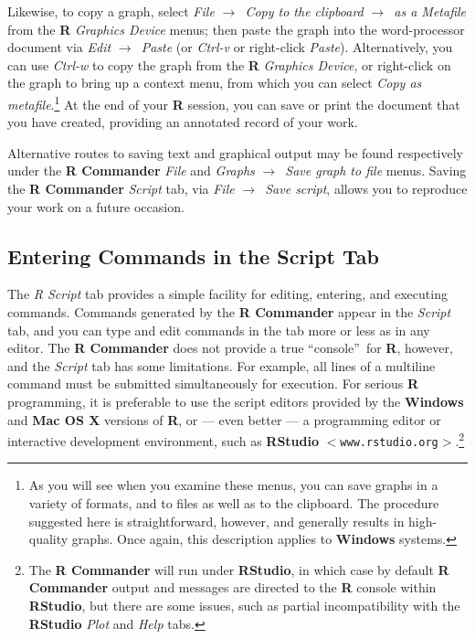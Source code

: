 \documentclass{article}%
\begin{document}
Likewise, to copy a graph, select \emph{File }$\longrightarrow$\emph{\ Copy to
the clipboard }$\longrightarrow$\emph{\ as a Metafile} from the \textbf{R}
\emph{Graphics Device} menus; then paste the graph into the word-processor
document via \emph{Edit }$\longrightarrow$\emph{\ Paste} (or \emph{Ctrl-v} or
right-click \emph{Paste}). Alternatively, you can use \emph{Ctrl-w} to copy
the graph from the \textbf{R} \emph{Graphics Device}, or right-click on the
graph to bring up a context menu, from which you can select \emph{Copy as
metafile}.\footnote{As you will see when you examine these menus, you can save
graphs in a variety of formats, and to files as well as to the clipboard. The
procedure suggested here is straightforward, however, and generally results in
high-quality graphs. Once again, this description applies to \textbf{Windows}
systems.} At the end of your \textbf{R} session, you can save or print the
document that you have created, providing an annotated record of your work.

Alternative routes to saving text and graphical output may be found
respectively under the \textbf{R Commander }\emph{File} and \emph{Graphs
}$\longrightarrow$\emph{\ Save graph to file} menus. Saving the \textbf{R
Commander} \emph{Script} tab, via \emph{File }$\longrightarrow$\emph{\ Save
script}, allows you to reproduce your work on a future occasion.

\subsection{Entering Commands in the Script Tab}

The \emph{R Script} tab provides a simple facility for editing, entering, and
executing commands. Commands generated by the \textbf{R Commander} appear in
the \emph{Script} tab, and you can type and edit commands in the tab more or
less as in any editor. The \textbf{R Commander} does not provide a true
\textquotedblleft console\textquotedblright\ for \textbf{R}, however, and the
\emph{Script} tab has some limitations. For example, all lines of a multiline
command must be submitted simultaneously for execution. For serious \textbf{R}
programming, it is preferable to use the script editors provided by the
\textbf{Windows} and \textbf{Mac OS X} versions of \textbf{R}, or --- even
better --- a programming editor or interactive development environment, such
as \textbf{RStudio} $<$\texttt{www.rstudio.org}$>$.\footnote{
The \textbf{R Commander} will run under \textbf{RStudio}, in which
case by default \textbf{R Commander} output and messages are directed to the
\textbf{R} console within \textbf{RStudio}, but there are some issues, such as
partial incompatibility with the \textbf{RStudio} \emph{Plot} and \emph{Help}
tabs.}
\end{document}

